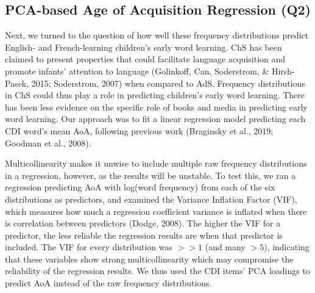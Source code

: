 \documentclass[10pt, letterpaper]{article}
\begin{document}
\hypertarget{pca-based-age-of-acquisition-regression-q2}{%
\subsection{PCA-based Age of Acquisition Regression
(Q2)}\label{pca-based-age-of-acquisition-regression-q2}}

Next, we turned to the question of how well these frequency
distributions predict English- and French-learning children's early word
learning. ChS has been claimed to present properties that could
facilitate language acquisition and promote infants' attention to
language (Golinkoff, Can, Soderstrom, \& Hirsh-Pasek, 2015; Soderstrom,
2007) when compared to AdS. Frequency distributions in ChS could thus
play a role in predicting children's early word learning. There has been
less evidence on the specific role of books and media in predicting
early word learning. Our approach was to fit a linear regression model
predicting each CDI word's mean AoA, following previous work (Braginsky
et al., 2019; Goodman et al., 2008).

Multicollinearity makes it unwise to include multiple raw frequency
distributions in a regression, however, as the results will be unstable.
To test this, we ran a regression predicting AoA with log(word
frequency) from each of the six distributions as predictors, and
examined the Variance Inflation Factor (VIF), which measures how much a
regression coefficient variance is inflated when there is correlation
between predictors (Dodge, 2008). The higher the VIF for a predictor,
the less reliable the regression results are when that predictor is
included. The VIF for every distribution was \(>>1\) (and many \(>5\)),
indicating that these variables show strong multicollinearity which may
compromise the reliability of the regression results. We thus used the
CDI items' PCA loadings to predict AoA instead of the raw frequency
distributions.
\end{document}

